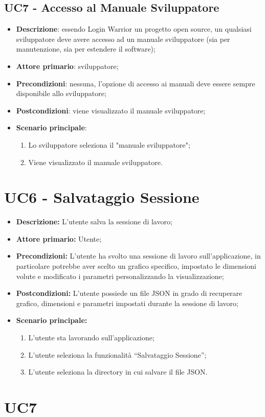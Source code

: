 \subsection{UC7 - Accesso al Manuale Sviluppatore}

\begin{itemize}
  \item \textbf{Descrizione}: essendo Login Warrior un progetto open source, un qualsiasi sviluppatore deve avere accesso ad un manuale sviluppatore (sia per manutenzione, sia per estendere il software);
  \item \textbf{Attore primario}: sviluppatore;
  \item \textbf{Precondizioni}: nessuna, l'opzione di accesso ai manuali deve essere sempre disponibile allo sviluppatore;
  \item \textbf{Postcondizioni}: viene visualizzato il manuale sviluppatore;
  \item \textbf{Scenario principale}: 
  \begin{enumerate}
    \item Lo sviluppatore seleziona il "manuale sviluppatore";
    \item Viene visualizzato il manuale sviluppatore.
  \end{enumerate}
\end{itemize}

\section{UC6 - Salvataggio Sessione}

\begin{itemize}
  \item \textbf{Descrizione:} L'utente salva la sessione di lavoro;
  \item \textbf{Attore primario:} Utente;
  \item \textbf{Precondizioni:} L'utente ha svolto una sessione di lavoro sull'applicazione, in particolare potrebbe aver scelto un grafico specifico, impostato le dimensioni volute e modificato i parametri personalizzando la visualizzazione;
  \item \textbf{Postcondizioni:} L'utente possiede un file JSON in grado di recuperare grafico, dimensioni e parametri impostati durante la sessione di lavoro;
  \item \textbf{Scenario principale:}
  \begin{enumerate}
    \item L'utente sta lavorando sull'applicazione;
    \item L'utente seleziona la funzionalità ``Salvataggio Sessione'';
    \item L'utente seleziona la directory in cui salvare il file JSON.
  \end{enumerate}
\end{itemize}

\section{UC7}
